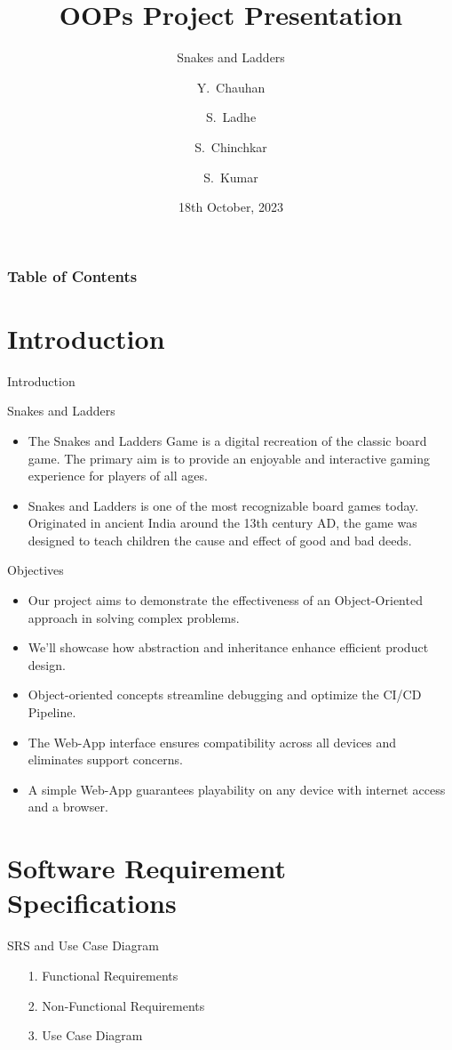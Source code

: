 \documentclass{beamer}
\title{OOPs Project Presentation}
\subtitle{Snakes and Ladders}
\author[Yuvraj, Shreyas, Sneha, Suraj] %
{Y.~Chauhan\inst{1} \and S.~Ladhe\inst{1} \and S.~Chinchkar\inst{1} \and S.~Kumar\inst{1}}
\institute[VFU] %
{
  \inst{1}%
  Computer Science and Engineering\\
  Indian Institute of Information Technology - \\Vadodara, International Campus Diu
}
\date{18th October, 2023}
\begin{document}
\maketitle

\begin{frame}
\frametitle{Table of Contents}
\tableofcontents
\end{frame}

\section{Introduction}
\begin{frame}{Introduction}
    \begin{block}{Snakes and Ladders}
   
   \begin{itemize}
       \item The Snakes and Ladders Game is a digital recreation of the classic board game. The primary aim is to provide an enjoyable and interactive gaming experience for players of all ages.

    \item  Snakes and Ladders is one of the most recognizable board games today. Originated in ancient India around
the 13th century AD, the game was designed to teach children the cause and effect of good and bad deeds.   
   \end{itemize}
    \end{block}
\end{frame}

\begin{frame}{Objectives}
    \begin{itemize}
\item Our project aims to demonstrate the effectiveness of an Object-Oriented approach in solving complex problems.
\item  We'll showcase how abstraction and inheritance enhance efficient product design.
\item Object-oriented concepts streamline debugging and optimize the CI/CD Pipeline.
\item  The Web-App interface ensures compatibility across all devices and eliminates support concerns.
\item  A simple Web-App guarantees playability on any device with internet access and a browser.
    \end{itemize}
\end{frame}

\section{Software Requirement Specifications}
\begin{frame}{SRS and Use Case Diagram}
    \begin{itemize}
        \item[1.] Functional Requirements
        \item[2.] Non-Functional Requirements
        \item[3.] Use Case Diagram
    \end{itemize}
\end{frame}
\end{document}
